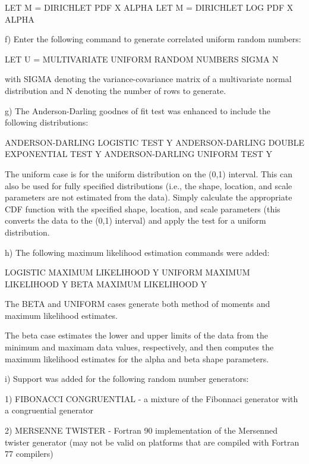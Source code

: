 {          LET M = DIRICHLET PDF X ALPHA
          LET M = DIRICHLET LOG PDF X ALPHA

    f) Enter the following command to generate correlated uniform
       random numbers:

          LET U = MULTIVARIATE UNIFORM RANDOM NUMBERS SIGMA N

       with SIGMA denoting the variance-covariance matrix of
       a multivariate normal distribution and N denoting the number
       of rows to generate.

    g) The Anderson-Darling goodnes of fit test was enhanced to
       include the following distributions:

          ANDERSON-DARLING LOGISTIC TEST Y
          ANDERSON-DARLING DOUBLE EXPONENTIAL TEST Y
          ANDERSON-DARLING UNIFORM TEST Y

       The uniform case is for the uniform distribution on the
       (0,1) interval.  This can also be used for fully specified
       distributions (i.e., the shape, location, and scale
       parameters are not estimated from the data).  Simply
       calculate the appropriate CDF function with the specified
       shape, location, and scale parameters (this converts the
       data to the (0,1) interval) and apply the test for a
       uniform distribution.
 
    h) The following maximum likelihood estimation commands were
       added:

          LOGISTIC MAXIMUM LIKELIHOOD Y
          UNIFORM MAXIMUM LIKELIHOOD Y
          BETA MAXIMUM LIKELIHOOD Y

       The BETA and UNIFORM cases generate both method of moments and
       maximum likelihood estimates.

       The beta case estimates the lower and upper limits of the
       data from the minimum and maximam data values, respectively,
       and then computes the maximum likelihood estimates for the
       alpha and beta shape parameters.

    i) Support was added for the following random number
       generators:

       1) FIBONACCI CONGRUENTIAL - a mixture of the Fibonnaci generator
                                   with a congruential generator

       2) MERSENNE TWISTER - Fortran 90 implementation of the
                             Mersenned twister generator (may not be
                             valid on platforms that are compiled
                             with Fortran 77 compilers)

}

